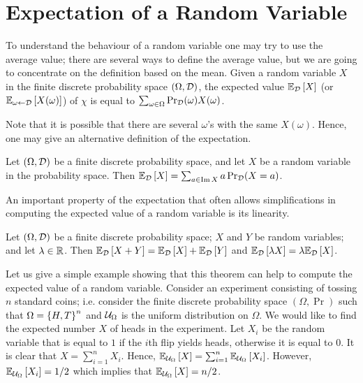 \chapter{Expectation of a Random Variable}
To understand the behaviour of a random variable one may try to use the average
value; there are several ways to define the average value, but we are going to
concentrate on the definition based on the mean. Given a random variable $X$
in the finite discrete probability space $(\Omega, \Distribution{D})$, the
expected value $\expectation[\Distribution{D}]{X}$ 
(or $\expectation[\omega \gets \Distribution{D}]{X(\omega)}$) of $\chi$ is equal to
$\sum_{\omega \in \Omega} \Pr_{\Distribution{D}}(\omega) X(\omega)$.

Note that it is possible that there are several $\omega$'s with the same
$X(\omega)$. Hence, one may give an alternative definition of the expectation.
\begin{theorem}
  Let $(\Omega, \Distribution{D})$ be a finite discrete probability space, and
  let $X$ be a random variable in the probability space. Then
  $\expectation[\Distribution{D}]{X} =
  \sum_{a \in \Im X} a\Pr_{\Distribution{D}}(X = a)$.
\end{theorem}

An important property of the expectation that often allows simplifications in
computing the expected value of a random variable is its linearity.
\begin{theorem}
  Let $(\Omega, \Distribution{D})$ be a finite discrete probability space; $X$
  and $Y$ be random variables; and let $\lambda \in \R$.
  Then $\expectation[\Distribution{D}]{X + Y} = 
    \expectation[\Distribution{D}]{X} + \expectation[\Distribution{D}]{Y}$ and
  $\expectation[\Distribution{D}]{\lambda X} = \lambda
  \expectation[\Distribution{D}]{X}$.
\end{theorem}
Let us give a simple example showing that this theorem can help to compute the
expected value of a random variable. Consider an experiment consisting of
tossing $n$ standard coins; i.e. consider the finite discrete probability space
$(\Omega, \Pr)$ such that $\Omega = \set{H, T}^n$ and $\Uniform{\Omega}$ is the
uniform distribution on $\Omega$. We would like to find the expected number $X$
of heads in the experiment. Let $X_i$ be the random variable that is equal to
$1$ if the $i$th flip yields heads, otherwise it is equal to $0$. It is clear
that $X = \sum_{i = 1}^n X_i$. Hence, $\expectation[\Uniform{\Omega}]{X} = 
\sum_{i = 1}^n \expectation[\Uniform{\Omega}]{X_i}$.
However, $\expectation[\Uniform{\Omega}]{X_i} = 1 / 2$ which implies that
$\expectation[\Uniform{\Omega}]{X} = n / 2$.

